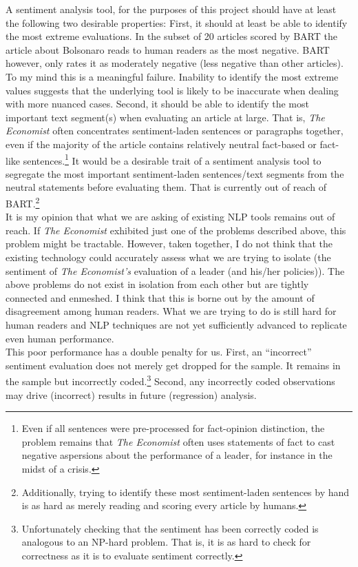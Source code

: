 \documentclass[11pt, letterpaper, twoside]{article}
\begin{document}
        A sentiment analysis tool, for the purposes of this project should have at least the following two desirable properties: First, it should at least be able to identify the most extreme evaluations. In the subset of 20 articles scored by BART the article about Bolsonaro reads to human readers as the most negative. BART however, only rates it as moderately negative (less negative than other articles). To my mind this is a meaningful failure. Inability to identify the most extreme values suggests that the underlying tool is likely to be inaccurate when dealing with more nuanced cases. Second, it should be able to identify the most important text segment(s) when evaluating an article at large. That is, \textit{The Economist} often concentrates sentiment-laden sentences or paragraphs together, even if the majority of the article contains relatively neutral fact-based or fact-like sentences.\footnote{Even if all sentences were pre-processed for fact-opinion distinction, the problem remains that \textit{The Economist} often uses statements of fact to cast negative aspersions about the performance of a leader, for instance in the midst of a crisis.} It would be a desirable trait of a sentiment analysis tool to segregate the most important sentiment-laden sentences/text segments from the neutral statements before evaluating them. That is currently out of reach of BART.\footnote{Additionally, trying to identify these most sentiment-laden sentences by hand is as hard as merely reading and scoring every article by humans.}\\

        It is my opinion that what we are asking of existing NLP tools remains out of reach. If \textit{The Economist} exhibited just one of the problems described above, this problem might be tractable. However, taken together, I do not think that the existing technology could accurately assess what we are trying to isolate (the sentiment of \textit{The Economist's} evaluation of a leader (and his/her policies)). The above problems do not exist in isolation from each other but are tightly connected and enmeshed. I think that this is borne out by the amount of disagreement among human readers. What we are trying to do is still hard for human readers and NLP techniques are not yet sufficiently advanced to replicate even human performance.\\

        This poor performance has a double penalty for us. First, an ``incorrect'' sentiment evaluation does not merely get dropped for the sample. It remains in the sample but incorrectly coded.\footnote{Unfortunately checking that the sentiment has been correctly coded is analogous to an NP-hard problem. That is, it is as hard to check for correctness as it is to evaluate sentiment correctly.} Second, any incorrectly coded observations may drive (incorrect) results in future (regression) analysis.\\
\end{document}

